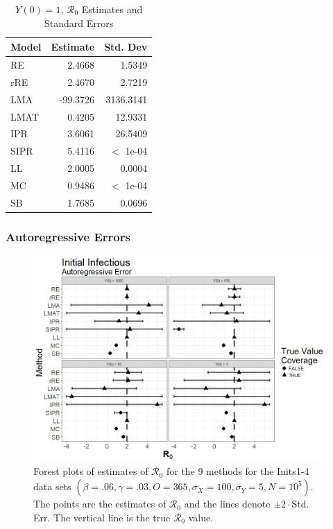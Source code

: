 \documentclass[12pt]{article}
\newcommand{\xxsir}{\ensuremath{9} } %
\newcommand{\rr}{\ensuremath{\mathcal{R}_0}}
\begin{document}
\begin{table}[H]
	
	\centering
	\begin{tabular}[t]{l|r|r}
		\hline
		Model & Estimate & Std. Dev\\
		\hline
		RE & 2.4668 & 1.5349\\
		\hline
		rRE & 2.4670 & 2.7219\\
		\hline
		LMA & -99.3726 & 3136.3141\\
		\hline
		LMAT & 0.4205 & 12.9331\\
		\hline
		IPR & 3.6061 & 26.5409\\
		\hline
		SIPR & 5.4116 & $<$ 1e-04\\
		\hline
		LL & 2.0005 & 0.0004\\
		\hline
		MC & 0.9486 & $<$ 1e-04\\
		\hline
		SB & 1.7685 & 0.0696\\
		\hline
	\end{tabular}
	\caption{$Y(0) = 1$, $\rr$ Estimates and Standard Errors}
\end{table}


\subsubsection{Autoregressive Errors}

\begin{figure}[H]
	\centering
	\includegraphics[scale=0.5]{images/start_ar.jpeg}
	\caption{Forest plots of estimates of $\rr$ for the \xxsir methods for the Inits1-4 data sets $(\beta=.06, \gamma=.03, O=365, \sigma_X=100, \sigma_Y=5, N=10^5)$.  The points are the estimates of $\rr$ and the lines denote $\pm 2\cdot $Std. Err.  The vertical line is the true $\rr$ value.}
\end{figure}
\end{document}
